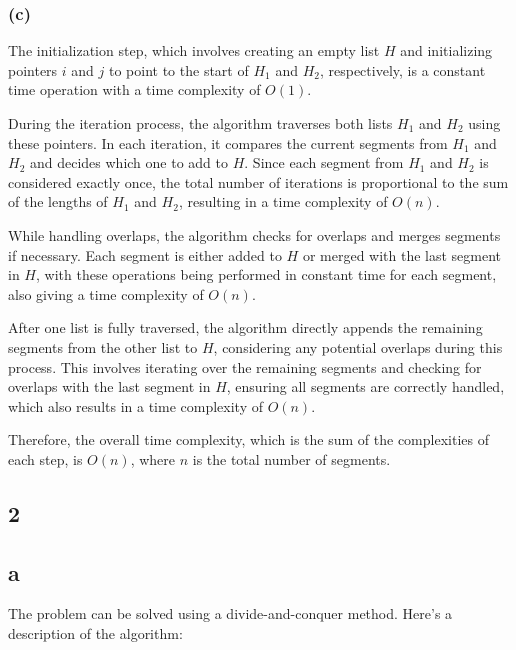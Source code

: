 \documentclass[12pt]{article}
\begin{document}
        \subsubsection*{(c)}

        \hspace{1.5em}The initialization step, which involves creating an empty list \( H \) and initializing pointers \( i \) and \( j \) to point to the start of \( H_1 \) and \( H_2 \), respectively, is a constant time operation with a time complexity of \( O(1) \). 

        During the iteration process, the algorithm traverses both lists \( H_1 \) and \( H_2 \) using these pointers. In each iteration, it compares the current segments from \( H_1 \) and \( H_2 \) and decides which one to add to \( H \). Since each segment from \( H_1 \) and \( H_2 \) is considered exactly once, the total number of iterations is proportional to the sum of the lengths of \( H_1 \) and \( H_2 \), resulting in a time complexity of \( O(n) \). 

        While handling overlaps, the algorithm checks for overlaps and merges segments if necessary. Each segment is either added to \( H \) or merged with the last segment in \( H \), with these operations being performed in constant time for each segment, also giving a time complexity of \( O(n) \). 

        After one list is fully traversed, the algorithm directly appends the remaining segments from the other list to \( H \), considering any potential overlaps during this process. This involves iterating over the remaining segments and checking for overlaps with the last segment in \( H \), ensuring all segments are correctly handled, which also results in a time complexity of \( O(n) \). 

        Therefore, the overall time complexity, which is the sum of the complexities of each step, is \( O(n) \), where \( n \) is the total number of segments.


    \subsection*{2}
        \subsection*{a}

        The problem can be solved using a divide-and-conquer method. Here’s a description of the algorithm:
\end{document}
